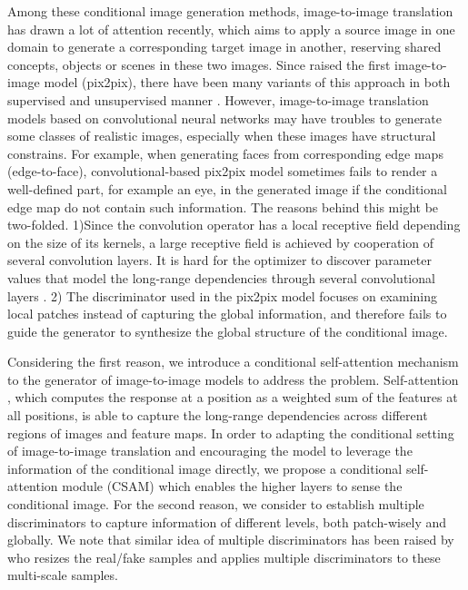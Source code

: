 %
Among these conditional image generation methods, image-to-image translation has drawn a lot of attention recently, which aims to apply a source image in one domain to generate a corresponding target image in another, reserving shared concepts, objects or scenes in these two images. Since \cite{pix2pix}  raised the first image-to-image model (pix2pix), there have been many variants of this approach in both supervised and unsupervised manner \cite{CycleGANs, DualGANs,CoupleGANs,BicycleGANs}. 
However, image-to-image translation models based on convolutional neural networks may have troubles to generate some classes of realistic images, especially when these images have structural constrains. For example, when generating faces from corresponding edge maps (edge-to-face), convolutional-based pix2pix model sometimes fails to render a well-defined part, for example an eye, in the generated image if the conditional edge map do not contain such information. The reasons behind this might be two-folded.
%
1)Since the convolution operator has a local receptive field depending on the size of its kernels, a large receptive field is achieved by cooperation of several convolution layers. It is hard for the optimizer to discover parameter values that model the long-range dependencies through several convolutional layers \cite{SAGANs}. 
2) The discriminator used in the pix2pix model \cite{pix2pix} focuses on examining local patches instead of capturing the global information, and therefore fails to guide the generator to synthesize the global structure of the conditional image. 

Considering the first reason, we introduce a conditional self-attention mechanism to the generator of image-to-image models to address the problem.
Self-attention \cite{Non-local, Attention, MachineReading, SAGANs}, which computes the response at a position as a weighted sum of the features at all positions, is able to capture the long-range dependencies across different regions of images and feature maps. In order to adapting the conditional setting of image-to-image translation and encouraging the model to leverage the information of the conditional image directly, we propose a conditional self-attention module (CSAM) which enables the higher layers to sense the conditional image. 
%
For the second reason, we consider to establish multiple discriminators to capture information of different levels, both patch-wisely and globally. We note that similar idea of multiple discriminators has been raised by \cite{LaplaceGANs, SGANs, StackGANs, CRN} who resizes the real/fake samples and applies multiple discriminators to these multi-scale samples. 

